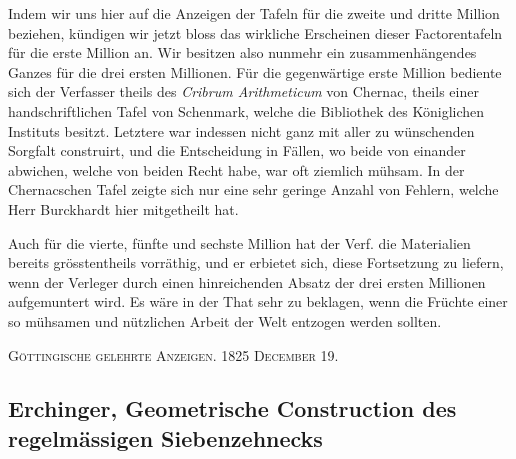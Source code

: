 \documentclass[12pt]{article}
\begin{document}
Indem wir uns hier auf die Anzeigen der Tafeln für die zweite und dritte Million beziehen, kündigen wir jetzt bloss das wirkliche Erscheinen dieser Factorentafeln für die erste Million an. Wir besitzen also nunmehr ein zusammenhängendes Ganzes für die drei ersten Millionen. Für die gegenwärtige erste Million bediente sich der Verfasser theils des \textit{Cribrum Arithmeticum} von Chernac, theils einer handschriftlichen Tafel von Schenmark, welche die Bibliothek des Königlichen Instituts besitzt. Letztere war indessen nicht ganz mit aller zu wünschenden Sorgfalt construirt, und die Entscheidung in Fällen, wo beide von einander abwichen, welche von beiden Recht habe, war oft ziemlich mühsam. In der Chernacschen Tafel zeigte sich nur eine sehr geringe Anzahl von Fehlern, welche Herr Burckhardt hier mitgetheilt hat.

Auch für die vierte, fünfte und sechste Million hat der Verf. die Materialien bereits grösstentheils vorräthig, und er erbietet sich, diese Fortsetzung zu liefern, wenn der Verleger durch einen hinreichenden Absatz der drei ersten Millionen aufgemuntert wird. Es wäre in der That sehr zu beklagen, wenn die Früchte einer so mühsamen und nützlichen Arbeit der Welt entzogen werden sollten.

\begin{center}
\textsc{Göttingische gelehrte Anzeigen. 1825 December 19.}
\end{center}

\subsection*{Erchinger, Geometrische Construction des regelmässigen Siebenzehnecks}
\end{document}
